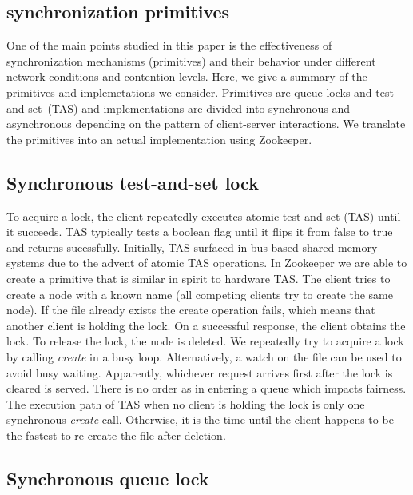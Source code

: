 \subsection{synchronization primitives}

One of the main points studied in this paper is the effectiveness of synchronization mechanisms (primitives) and their behavior under different network conditions and contention levels. Here, we give a summary of the primitives and implemetations we consider. Primitives are queue locks and test-and-set~(TAS) and implementations are divided into synchronous and asynchronous depending on the pattern of client-server interactions. We translate the primitives into an actual implementation using Zookeeper.

\subsection{Synchronous test-and-set lock}

To acquire a lock, the client repeatedly executes atomic test-and-set (TAS) until it succeeds. TAS typically tests a boolean flag until it flips it from false to true and returns sucessfully. Initially, TAS surfaced in bus-based shared memory systems due to the advent of atomic TAS operations. In Zookeeper we are able to create a primitive that is similar in spirit to hardware TAS. The client tries to create a node with a known name (all competing clients try to create the same node). If the file already exists the create operation fails, which means that another client is holding the lock. On a successful response, the client obtains the lock. To release the lock, the node is deleted. We repeatedly try to acquire a lock by calling \emph{create} in a busy loop. Alternatively, a watch on the file can be used to avoid busy waiting. Apparently, whichever request arrives first after the lock is cleared is served. There is no order as in entering a queue which impacts fairness. The execution path of TAS when no client is holding the lock is only one synchronous \emph{create} call. Otherwise, it is the time until the client happens to be the fastest to re-create the file after deletion.

\subsection{Synchronous queue lock}

